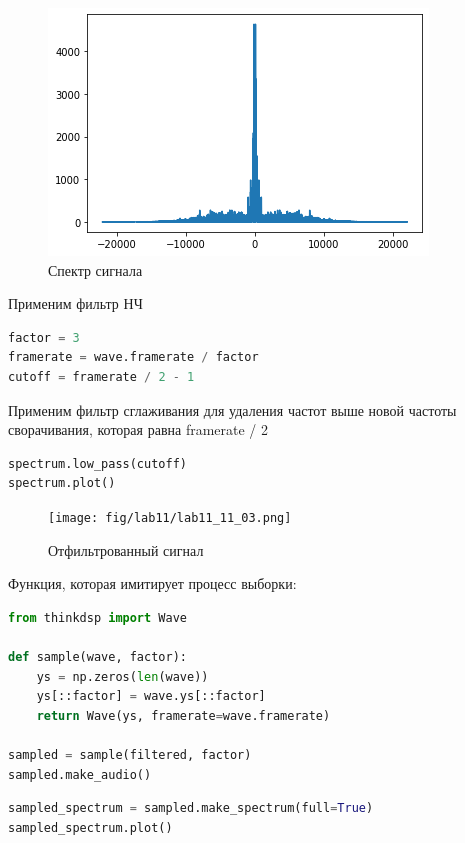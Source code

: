 \begin{figure}[H]
	\begin{center}
		\includegraphics[scale=1]{fig/lab11/lab11_02.png}
		\caption{Спектр сигнала}
	\end{center}
\end{figure}

Применим фильтр НЧ

\begin{lstlisting}[language=Python]
factor = 3
framerate = wave.framerate / factor
cutoff = framerate / 2 - 1
\end{lstlisting}

Применим фильтр сглаживания для удаления частот выше новой частоты сворачивания, которая равна framerate / 2

\begin{lstlisting}[language=Python]
spectrum.low_pass(cutoff)
spectrum.plot()
\end{lstlisting}

\begin{figure}[H]
	\begin{center}
		\texttt{[image: fig/lab11/lab11\_11\_03.png]}
		\caption{Отфильтрованный сигнал}
	\end{center}
\end{figure}

Функция, которая имитирует процесс выборки:

\begin{lstlisting}[language=Python]
from thinkdsp import Wave

def sample(wave, factor):
    ys = np.zeros(len(wave))
    ys[::factor] = wave.ys[::factor]
    return Wave(ys, framerate=wave.framerate) 
    
sampled = sample(filtered, factor)
sampled.make_audio()
\end{lstlisting}

\begin{lstlisting}[language=Python]
sampled_spectrum = sampled.make_spectrum(full=True)
sampled_spectrum.plot()
\end{lstlisting}

